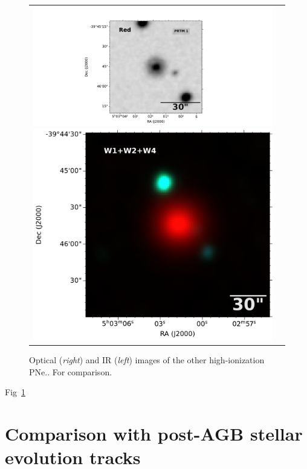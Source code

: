 \documentclass[twocolumn]{article}
\begin{document}
\begin{figure}
\begin{tabular}{l l}
\includegraphics[width=0.535\linewidth, trim=280 10 340 10, clip]{../known-pn/PNPRTM1/dss_search_red.pdf}
\includegraphics[width=0.47\linewidth, trim=58 0 0 0]{../known-pn/PNPRTM1/0754m394_ac51-w4-int-3_ra75.75721626934_dec-39.76236833917_asec150.000-421-RGB.pdf}\\

\end{tabular}  
  \caption{Optical (\textit{right}) and IR (\textit{left}) images of the other high-ionization PNe.. For comparison. } 
  \label{fig:images-known}
\end{figure}

Fig~\ref{fig:images-known}

\section{Comparison with post-AGB stellar evolution tracks}
\label{sec:tracks}
\end{document}
